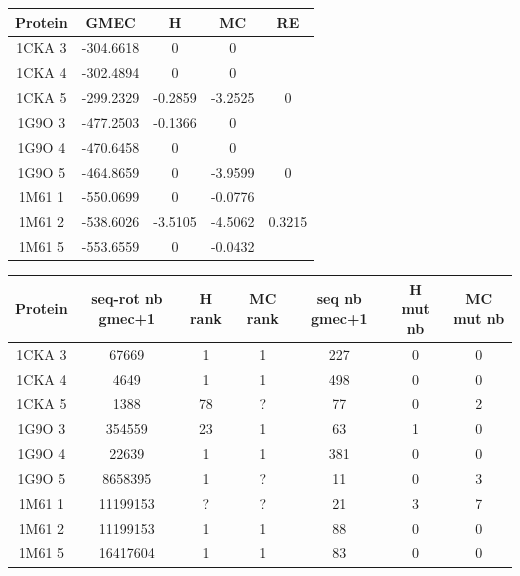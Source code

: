 \documentclass[a4paper,12pt]{book}
\begin{document}
    \begin{table}[h]
      \centering

      \begin{tabular}{|c|c|c|c|c|}


        \hline
        Protein & GMEC & H & MC & RE \\
        \hline
        1CKA 3 & -304.6618 & 0 & 0 & \\
        1CKA 4 & -302.4894 & 0 & 0 & \\
        1CKA 5 & -299.2329 & -0.2859 & -3.2525 & 0 \\
        1G9O 3 & -477.2503 & -0.1366 & 0 & \\
        1G9O 4 & -470.6458 & 0 & 0 & \\
        1G9O 5 & -464.8659 & 0 & -3.9599 &  0 \\
        1M61 1 & -550.0699 & 0 & -0.0776 & \\
        1M61 2 & -538.6026 & -3.5105 & -4.5062 & 0.3215 \\
        1M61 5 & -553.6559 & 0 & -0.0432 & \\
        
        \hline


 \end{tabular}      
 \label{tab_1}      
\end{table}


    \begin{table}[h]
      \centering

      \begin{tabular}{|c|c|c|c|c|c|c|}


        \hline
        Protein & seq-rot nb gmec+1 & H rank  & MC rank  & seq nb gmec+1 & H mut nb & MC mut nb \\
        \hline
        1CKA 3 & 67669 & 1 & 1 & 227 & 0 & 0 \\
        1CKA 4 & 4649 & 1 & 1 & 498 & 0 & 0 \\
        1CKA 5 & 1388 & 78 & ? & 77 & 0 & 2 \\
        1G9O 3 & 354559 & 23 & 1 & 63 & 1 & 0 \\
        1G9O 4 & 22639 & 1 & 1 & 381 & 0 & 0 \\
        1G9O 5 & 8658395 & 1 & ? &  11 & 0 & 3 \\
        1M61 1 & 11199153 & ? & ? & 21 & 3 & 7 \\
        1M61 2 & 11199153 & 1 & 1 & 88 & 0 & 0 \\
        1M61 5 & 16417604 & 1 & 1 & 83 & 0 & 0 \\
        
        \hline


 \end{tabular}      
 \label{tab_2}      
\end{table}
\end{document}

